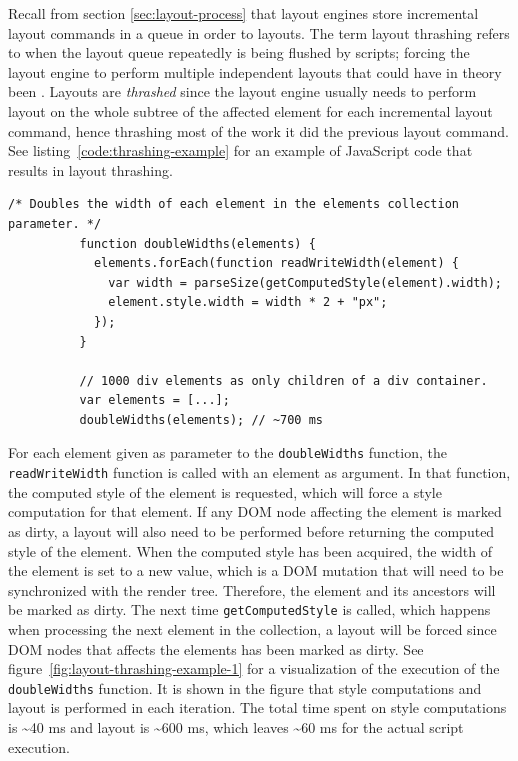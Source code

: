 \documentclass[a4paper,11pt]{kth-mag}
\newcommand{\code}[1]{\texttt{#1}}
\begin{document}
        Recall from section \ref{sec:layout-process} that \glspl{layout engine} store incremental layout commands in a queue in order to  layouts.
        The term \gls{layout thrashing} refers to when the layout queue repeatedly is being flushed by scripts; forcing the \gls{layout engine} to perform multiple independent layouts that could have in theory been .
        Layouts are \emph{thrashed} since the layout engine usually needs to perform layout on the whole subtree of the affected element for each incremental layout command, hence thrashing most of the work it did the previous layout command.
        See listing~\ref{code:thrashing-example} for an example of \gls{JavaScript} code that results in layout thrashing.
        \begin{lstlisting}[gobble=10,caption={Example of layout thrashing. The code reads and double the widths of 1000 \glspl{element} in \textasciitilde700 ms. The \code{parseSize} function is not important to understand the example.}, captionpos=b, label={code:thrashing-example}]
          /* Doubles the width of each element in the elements collection parameter. */
          function doubleWidths(elements) {
            elements.forEach(function readWriteWidth(element) {
              var width = parseSize(getComputedStyle(element).width);
              element.style.width = width * 2 + "px";
            });
          }

          // 1000 div elements as only children of a div container.
          var elements = [...];
          doubleWidths(elements); // ~700 ms
        \end{lstlisting}
        For each element given as parameter to the \code{doubleWidths} function, the \code{readWriteWidth} function is called with an element as argument.
        In that function, the computed style of the element is requested, which will force a style computation for that element.
        If any \gls{DOM} node affecting the element is marked as dirty, a layout will also need to be performed before returning the computed style of the element.
        When the computed style has been acquired, the width of the element is set to a new value, which is a \gls{DOM} mutation that will need to be synchronized with the render tree.
        Therefore, the element and its ancestors will be marked as dirty.
        The next time \code{getComputedStyle} is called, which happens when processing the next element in the collection, a layout will be forced since \gls{DOM} nodes that affects the elements has been marked as dirty.
        See figure~\ref{fig:layout-thrashing-example-1} for a visualization of the execution of the \code{doubleWidths} function.
        It is shown in the figure that style computations and layout is performed in each iteration.
        The total time spent on style computations is \textasciitilde40 ms and layout is \textasciitilde600 ms, which leaves \textasciitilde60 ms for the actual script execution.
\end{document}
